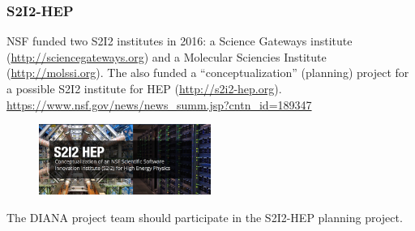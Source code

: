 \begin{frame}
\frametitle{S2I2-HEP}

NSF funded two S2I2 institutes in 2016: a Science Gateways institute (\url{http://sciencegateways.org}) and a Molecular Sciencies Institute (\url{http://molssi.org}). The also funded a ``conceptualization'' (planning) project for a possible S2I2 institute for HEP (\url{http://s2i2-hep.org}).
\vskip 0.12in
\url{https://www.nsf.gov/news/news_summ.jsp?cntn_id=189347}
\begin{figure}[htbp]
\begin{center}
\includegraphics[width=0.5\textwidth]{images/s2i2-hep.png}
\end{center}
\end{figure}

The DIANA project team should participate in the S2I2-HEP planning project.
\end{frame}


